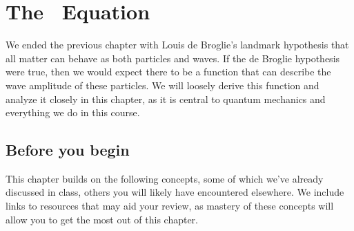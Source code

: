 

%

\chapter{The \Sch\ Equation} \label{ch:sch}

We ended the previous chapter with Louis de Broglie's landmark hypothesis that all matter can behave as both particles and waves. 
If the de Broglie hypothesis were true, then we would expect there to be a function that can describe the wave amplitude of these particles. 
We will loosely derive this function and analyze it closely in this chapter, as it is central to quantum mechanics and everything we do in this course. 


\section{Before you begin}

This chapter builds on the following concepts, some of which we've already discussed in class, others you will likely have encountered elsewhere.
We include links to resources that may aid your review, as mastery of these concepts will allow you to get the most out of this chapter.

